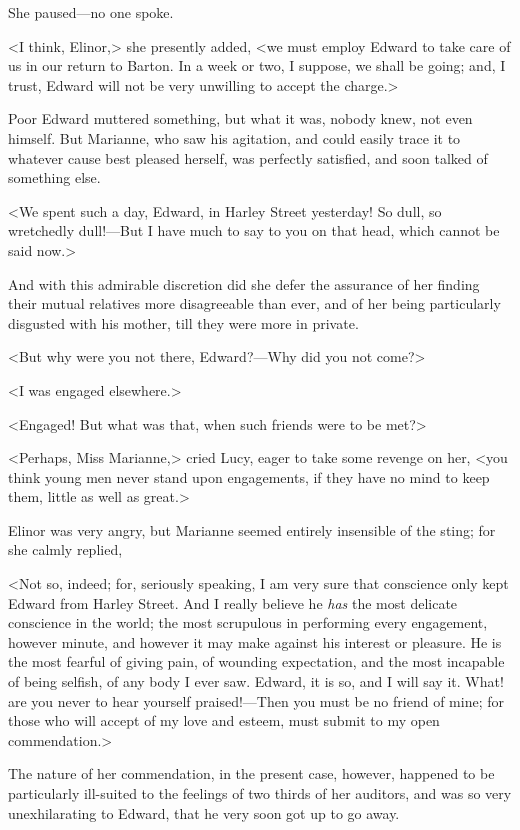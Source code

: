 She paused—no one spoke.

<I think, Elinor,> she presently added, <we must employ Edward to take care of us in our return to Barton. In a week or two, I suppose, we shall be going; and, I trust, Edward will not be very unwilling to accept the charge.>

Poor Edward muttered something, but what it was, nobody knew, not even himself. But Marianne, who saw his agitation, and could easily trace it to whatever cause best pleased herself, was perfectly satisfied, and soon talked of something else.

<We spent such a day, Edward, in Harley Street yesterday! So dull, so wretchedly dull!—But I have much to say to you on that head, which cannot be said now.>

And with this admirable discretion did she defer the assurance of her finding their mutual relatives more disagreeable than ever, and of her being particularly disgusted with his mother, till they were more in private.

<But why were you not there, Edward?—Why did you not come?>

<I was engaged elsewhere.>

<Engaged! But what was that, when such friends were to be met?>

<Perhaps, Miss Marianne,> cried Lucy, eager to take some revenge on her, <you think young men never stand upon engagements, if they have no mind to keep them, little as well as great.>

Elinor was very angry, but Marianne seemed entirely insensible of the sting; for she calmly replied,

<Not so, indeed; for, seriously speaking, I am very sure that conscience only kept Edward from Harley Street. And I really believe he \textit{has} the most delicate conscience in the world; the most scrupulous in performing every engagement, however minute, and however it may make against his interest or pleasure. He is the most fearful of giving pain, of wounding expectation, and the most incapable of being selfish, of any body I ever saw. Edward, it is so, and I will say it. What! are you never to hear yourself praised!—Then you must be no friend of mine; for those who will accept of my love and esteem, must submit to my open commendation.>

The nature of her commendation, in the present case, however, happened to be particularly ill-suited to the feelings of two thirds of her auditors, and was so very unexhilarating to Edward, that he very soon got up to go away.

